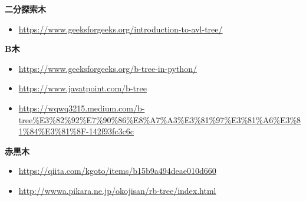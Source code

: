 \noindent \textbf{二分探索木}
\begin{itemize}
  \item \url{https://www.geeksforgeeks.org/introduction-to-avl-tree/}
\end{itemize}

\noindent \textbf{B木}
\begin{itemize}
  \item \url{https://www.geeksforgeeks.org/b-tree-in-python/}
  \item \url{https://www.javatpoint.com/b-tree}
  \item \url{https://wqwq3215.medium.com/b-tree%E3%82%92%E7%90%86%E8%A7%A3%E3%81%97%E3%81%A6%E3%81%84%E3%81%8F-142f93fc3c6c}
\end{itemize}

\noindent \textbf{赤黒木}

\begin{itemize}
  \item \url{https://qiita.com/kgoto/items/b15b9a494deae010d660}
  \item \url{http://wwwa.pikara.ne.jp/okojisan/rb-tree/index.html}
\end{itemize}